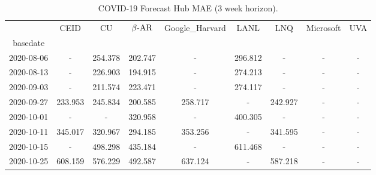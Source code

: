     
\begin{table*}[t]
\small
\caption{COVID-19 Forecast Hub MAE (3 week horizon).\label{tab:reichalb_eval_3} }

\centering
    
\begin{tabular}{ccccccccc}
\toprule
{} &     CEID &                             CU &                          $\beta\text{-AR}$ &                Google\_Harvard &      LANL &       LNQ & Microsoft &                            UVA \\
basedate   &          &                                &                                 &                                &           &           &           &                                \\
\midrule
2020-08-06 &        - &                        254.378 &   {\cellcolor{blue!25} 202.747} &                              - &   296.812 &         - &         - &                              - \\
2020-08-13 &        - &                        226.903 &   {\cellcolor{blue!25} 194.915} &                              - &   274.213 &         - &         - &                              - \\
2020-09-03 &        - &  {\cellcolor{blue!25} 211.574} &                         223.471 &                              - &   274.117 &         - &         - &                              - \\
2020-09-27 &  233.953 &                        245.834 &   {\cellcolor{blue!25} 200.585} &                        258.717 &         - &   242.927 &         - &                              - \\
2020-10-01 &        - &                              - &   {\cellcolor{blue!25} 320.958} &                              - &   400.305 &         - &         - &                              - \\
2020-10-11 &  345.017 &                        320.967 &   {\cellcolor{blue!25} 294.185} &                        353.256 &         - &   341.595 &         - &                              - \\
2020-10-15 &        - &                        498.298 &   {\cellcolor{blue!25} 435.184} &                              - &   611.468 &         - &         - &                              - \\
2020-10-25 &  608.159 &                        576.229 &   {\cellcolor{blue!25} 492.587} &                        637.124 &         - &   587.218 &         - &                              - \\

\end{tabular}
\end{table*}
